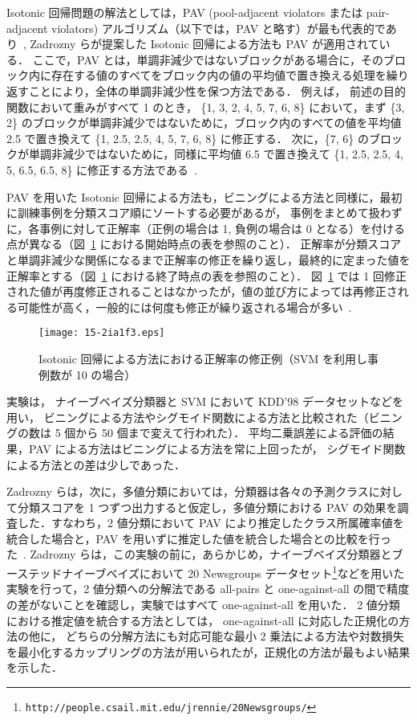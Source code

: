 \documentclass[japanese]{jnlp_1.4}
\begin{document}
Isotonic 回帰問題の解法としては，PAV (pool-adjacent violators または pair-adjacent violators) アルゴリズム（以下では，PAV と略す）が最も代表的であり~\cite{Kearsley96,Ahuja01,Mizil05,Fawcett06}, Zadrozny らが提案した Isotonic 回帰による方法も PAV が適用されている．
ここで，PAV とは，単調非減少ではないブロックがある場合に，そのブロック内に存在する値のすべてをブロック内の値の平均値で置き換える処理を繰り返すことにより，全体の単調非減少性を保つ方法である．
例えば，
前述の目的関数において重みがすべて 1 のとき，
\{1, 3, 2, 4, 5, 7, 6, 8\} において，まず \{3, 2\} 
のブロックが単調非減少ではないために，ブロック内のすべての値を平均値 2.5 で置き換えて \{1, 2.5, 2.5, 4, 5, 7, 6, 8\} に修正する．
次に，\{7, 6\} のブロックが単調非減少ではないために，同様に平均値 6.5 で置き換えて \{1, 2.5, 2.5, 4, 5, 6.5, 6.5, 8\} に修正する方法である~\cite{Kearsley96}. 

PAV を用いた Isotonic 回帰による方法も，ビニングによる方法と同様に，最初に訓練事例を分類スコア順にソートする必要があるが，
事例をまとめて扱わずに，各事例に対して正解率（正例の場合は 1, 負例の場合は 0 となる）を付ける点が異なる（図~\ref{Isotonic} における開始時点の表を参照のこと）．
正解率が分類スコアと単調非減少な関係になるまで正解率の修正を繰り返し，最終的に定まった値を正解率とする（図~\ref{Isotonic} における終了時点の表を参照のこと）．
図~\ref{Isotonic} では 1 回修正された値が再度修正されることはなかったが，値の並び方によっては再修正される可能性が高く，一般的には何度も修正が繰り返される場合が多い~\cite{Kearsley96,Ahuja01,Mizil05,Fawcett06}. 


\begin{figure}[t]
  \begin{center}
\texttt{[image: 15-2ia1f3.eps]}
\caption{Isotonic 回帰による方法における正解率の修正例（SVM を利用し事例数が 10 の場合）}
\label{Isotonic}
  \end{center}
\end{figure}

実験は，
ナイーブベイズ分類器と SVM において KDD'98 データセットなどを用い，
ビニングによる方法やシグモイド関数による方法と比較された（ビニングの数は 5 個から 50 個まで変えて行われた）．
平均二乗誤差による評価の結果，PAV による方法はビニングによる方法を常に上回ったが，
シグモイド関数による方法との差は少しであった．

Zadrozny らは，次に，多値分類においては，分類器は各々の予測クラスに対して分類スコアを 1 つずつ出力すると仮定し，多値分類における PAV の効果を調査した．すなわち，2 値分類において PAV により推定したクラス所属確率値を統合した場合と，PAV を用いずに推定した値を統合した場合との比較を行った~\cite{Zadrozny02}. 
Zadrozny らは，この実験の前に，あらかじめ，ナイーブベイズ分類器とブーステッドナイーブベイズにおいて 20 Newsgroups データセット\footnote{
	\texttt{http://people.csail.mit.edu/jrennie/20Newsgroups/}
}などを用いた実験を行って，2 値分類への分解法である all-pairs と one-against-all の間で精度の差がないことを確認し，実験ではすべて one-against-all を用いた．
2 値分類における推定値を統合する方法としては，
one-against-all に対応した正規化の方法の他に，
どちらの分解方法にも対応可能な最小 2 乗法による方法や対数損失を最小化するカップリングの方法が用いられたが，正規化の方法が最もよい結果を示した．
\end{document}
